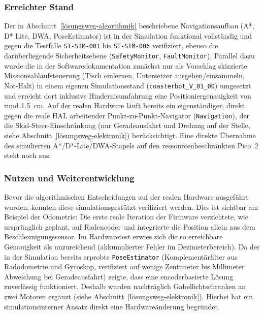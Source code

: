 
\subsubsection*{Erreichter Stand}

Der in Abschnitt~\ref{lösungsweg-algorithmik} beschriebene Navigationsaufbau (A*, D* Lite, DWA, Pose\-Estimator) ist in der Simulation funktional vollständig und gegen die Testfälle \texttt{ST-SIM-001} bis \texttt{ST-SIM-006} verifiziert, ebenso die darüberliegende Sicherheitsebene (\texttt{SafetyMonitor}, \texttt{FaultMonitor}). Parallel dazu wurde die in der Softwaredokumentation zunächst nur als Vorschlag skizzierte Missionsablaufsteuerung (Tisch einlernen, Untersetzer ausgeben/einsammeln, Not-Halt) in einem eigenen Simulationsstand (\texttt{coasterbot\_V\_01\_00}) umgesetzt und erreicht dort inklusive Hindernisumfahrung eine Positioniergenauigkeit von rund \SI{1,5}{\centi\meter}. Auf der realen Hardware läuft bereits ein eigenständiger, direkt gegen die reale HAL arbeitender Punkt-zu-Punkt-Navigator (\texttt{Navigation}), der die Skid-Steer-Einschränkung (nur Geradeausfahrt und Drehung auf der Stelle, siehe Abschnitt~\ref{lösungsweg-elektronik}) berücksichtigt. Eine direkte Übernahme des simulierten A*/D*-Lite/DWA-Stapels auf den ressourcenbeschränkten Pico~2 steht noch aus.

\subsubsection*{Nutzen und Weiterentwicklung}

Bevor die algorithmischen Entscheidungen auf der realen Hardware ausgeführt wurden, konnten diese simulationsgestützt verifiziert werden.
Dies ist sichtbar am Beispiel der Odometrie: Die erste reale Iteration der Firmware verzichtete, wie ursprünglich geplant, auf Radencoder und integrierte die Position allein aus dem Beschleunigungssensor. Im Hardwaretest erwies sich die so erreichbare Genauigkeit als unzureichend (akkumulierter Fehler im Dezimeterbereich). Da der in der Simulation bereits erprobte \texttt{PoseEstimator} (Komplementärfilter aus Radodometrie und Gyroskop, verifiziert auf wenige Zentimeter bis Millimeter Abweichung bei Geradeausfahrt) zeigte, dass eine encoderbasierte Lösung zuverlässig funktioniert. Deshalb wurden nachträglich Gabellichtschranken an zwei Motoren ergänzt (siehe Abschnitt~\ref{lösungsweg-elektronik}). Hierbei hat ein simulationsinterner Ansatz direkt eine Hardwareänderung begründet.

